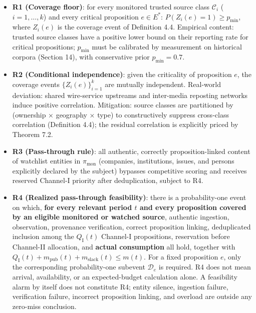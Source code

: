 \documentclass[
  11pt]{article}
\providecommand{\tightlist}{%
  \setlength{\itemsep}{0pt}\setlength{\parskip}{0pt}}
\begin{document}
\begin{itemize}
\tightlist
\item
  \textbf{R1 (Coverage floor)}: for every monitored trusted source class
  \(\mathcal{C}_i\) (\(i = 1,\dots,k\)) and every critical proposition
  \(e \in E^*\): \(P(Z_i(e) = 1) \ge p_{\min}\), where \(Z_i(e)\) is the
  coverage event of Definition 4.4. Empirical content: trusted source
  classes have a positive lower bound on their reporting rate for
  critical propositions; \(p_{\min}\) must be calibrated by measurement
  on historical corpora (Section 14), with conservative prior
  \(p_{\min} = 0.7\).
\item
  \textbf{R2 (Conditional independence)}: given the criticality of
  proposition \(e\), the coverage events \(\{Z_i(e)\}_{i=1}^k\) are
  mutually independent. Real-world deviation: shared wire-service
  upstreams and inter-media reposting networks induce positive
  correlation. Mitigation: source classes are partitioned by (ownership
  × geography × type) to constructively suppress cross-class correlation
  (Definition 4.4); the residual correlation is explicitly priced by
  Theorem 7.2.
\item
  \textbf{R3 (Pass-through rule)}: all authentic, correctly
  proposition-linked content of watchlist entities in
  \(\pi_{\mathrm{mon}}\) (companies, institutions, issues, and persons
  explicitly declared by the subject) bypasses competitive scoring and
  receives reserved Channel-I priority after deduplication, subject to
  R4.
\item
  \textbf{R4 (Realized pass-through feasibility)}: there is a
  probability-one event on which, \textbf{for every relevant period
  \(t\) and every proposition covered by an eligible monitored or
  watched source}, authentic ingestion, observation, provenance
  verification, correct proposition linking, deduplicated inclusion
  among the \(Q_{\mathrm I}(t)\) Channel-I propositions, reservation
  before Channel-II allocation, and \textbf{actual consumption} all
  hold, together with
  \(Q_{\mathrm I}(t)+m_{\mathrm{pub}}(t)+m_{\mathrm{slack}}(t)\le m(t)\).
  For a fixed proposition \(e\), only the corresponding probability-one
  subevent \(\mathcal D_e\) is required. R4 does not mean arrival,
  availability, or an expected-budget calculation alone. A feasibility
  alarm by itself does not constitute R4; entity silence, ingestion
  failure, verification failure, incorrect proposition linking, and
  overload are outside any zero-miss conclusion.
\end{itemize}
\end{document}
